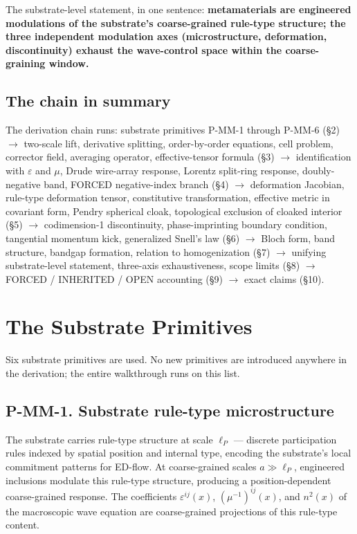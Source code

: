\documentclass[11pt,a4paper]{article}
\begin{document}
The substrate-level statement, in one sentence: \textbf{metamaterials are engineered modulations of the substrate's coarse-grained rule-type structure; the three independent modulation axes (microstructure, deformation, discontinuity) exhaust the wave-control space within the coarse-graining window.}

\subsection{The chain in summary}

The derivation chain runs: substrate primitives P-MM-1 through P-MM-6 (\S2) $\to$ two-scale lift, derivative splitting, order-by-order equations, cell problem, corrector field, averaging operator, effective-tensor formula (\S3) $\to$ identification with $\varepsilon$ and $\mu$, Drude wire-array response, Lorentz split-ring response, doubly-negative band, FORCED negative-index branch (\S4) $\to$ deformation Jacobian, rule-type deformation tensor, constitutive transformation, effective metric in covariant form, Pendry spherical cloak, topological exclusion of cloaked interior (\S5) $\to$ codimension-1 discontinuity, phase-imprinting boundary condition, tangential momentum kick, generalized Snell's law (\S6) $\to$ Bloch form, band structure, bandgap formation, relation to homogenization (\S7) $\to$ unifying substrate-level statement, three-axis exhaustiveness, scope limits (\S8) $\to$ FORCED / INHERITED / OPEN accounting (\S9) $\to$ exact claims (\S10).

\section{The Substrate Primitives}

Six substrate primitives are used. No new primitives are introduced anywhere in the derivation; the entire walkthrough runs on this list.

\subsection{P-MM-1. Substrate rule-type microstructure}

The substrate carries rule-type structure at scale $\ell_P$ --- discrete participation rules indexed by spatial position and internal type, encoding the substrate's local commitment patterns for ED-flow. At coarse-grained scales $a \gg \ell_P$, engineered inclusions modulate this rule-type structure, producing a position-dependent coarse-grained response. The coefficients $\varepsilon^{ij}(x)$, $(\mu^{-1})^{ij}(x)$, and $n^2(x)$ of the macroscopic wave equation are coarse-grained projections of this rule-type content.
\end{document}
